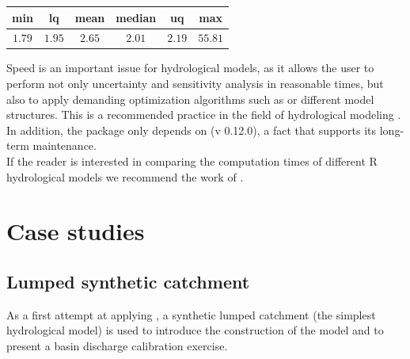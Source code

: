 \begin{table}[h!]
	\begin{tabular}{ c  c  c  c  c  c }
	\toprule
	\textbf{min} &  \textbf{lq} & \textbf{mean} & \textbf{median} & \textbf{uq} & \textbf{max} \\
	\midrule
	$1.79$       &   $1.95$     &   $2.65$      &     $2.01$      &   $2.19$    &  $55.81$ \\
	\bottomrule
    \end{tabular}
    \label{table:performance}
\end{table}

Speed is an important issue for hydrological models, as it allows the user to perform not only uncertainty and 
sensitivity analysis in reasonable times, but also to apply demanding optimization algorithms such 
as  \citep{de_opt:2016} or different model structures. This is a recommended practice in the field of 
hydrological modeling \citep{beven_manifesto_2006, beven:2008, pianosi:2016}. In addition, the package only depends on 
(v 0.12.0), a fact that supports its long-term maintenance. \\
If the reader is interested in comparing the computation times of different R hydrological models we recommend the work 
of \citet{paul:2020}.  


\section{Case studies}

\subsection{Lumped synthetic catchment}

As a first attempt at applying , a synthetic lumped catchment (the simplest hydrological model) is used to
introduce the construction of the model and to present a basin discharge calibration exercise.

